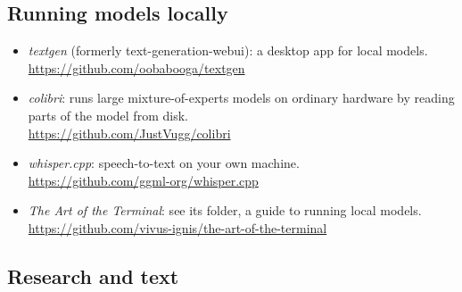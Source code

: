 \subsection{Running models locally}

\begin{itemize}
  \item \emph{textgen} (formerly text-generation-webui): a desktop app for
    local models.\\
    \url{https://github.com/oobabooga/textgen}
  \item \emph{colibri}: runs large mixture-of-experts models on ordinary
    hardware by reading parts of the model from disk.\\
    \url{https://github.com/JustVugg/colibri}
  \item \emph{whisper.cpp}: speech-to-text on your own machine.\\
    \url{https://github.com/ggml-org/whisper.cpp}
  \item \emph{The Art of the Terminal}: see its 
    folder, a guide to running local models.\\
    \url{https://github.com/vivus-ignis/the-art-of-the-terminal}
\end{itemize}

\subsection{Research and text}

